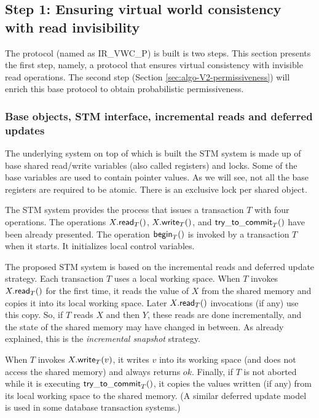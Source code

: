 \subsection{Step 1: Ensuring virtual world consistency with read invisibility}
\label{sec:algorithm-V1}


The protocol (named as IR\_VWC\_P)  is built  is two
steps.  This section  presents  the  first step,  namely,  a protocol  that
ensures  virtual consistency  with  invisible read  operations. The  second
step  (Section  \ref{sec:algo-V2-permissiveness})  will  enrich  this  base
protocol to obtain  probabilistic permissiveness.





\subsubsection{Base objects, STM interface, incremental reads and 
deferred updates}
The underlying system  on top of which  is built the STM system  is made up
of  base shared read/write  variables (also called registers)  and  locks.  
Some of the base variables are used to contain pointer values. 
As we will see, not all the  base registers  are required to be atomic. 
There is an exclusive lock per shared object. 


The STM  system provides  the process that issues a transaction  $T$ with
 four   operations. The operations 
$X.{\sf read}_T()$,   $X.{\sf  write}_T()$,  and ${\sf
try\_to\_commit}_T()$ have been already presented. 
The operation  ${\sf  begin}_T()$  is invoked by a transaction  $T$ when 
it starts.   It initializes local control variables. 


The proposed STM system is based on the incremental reads and deferred 
update strategy. Each transaction $T$ uses a local working space.  
When  $T$ invokes $X.{\sf  read}_T()$  for  the first   time, it  reads the
value of $X$ from  the shared  memory and copies it into its  local working
space. Later  $X.{\sf  read}_T()$ invocations  (if any)  use this copy.
So, if $T$  reads $X$ and then $Y$, these reads  are done incrementally, and
the state of the shared memory may  have changed in between. 
As already explained, this is  the  {\it incremental snapshot} strategy. 


When  $T$ invokes $X.{\sf write}_T(v)$,  it writes  $v$ into  its working
space (and does not access the  shared memory) and always returns $ok$. 
%
Finally, if $T$ is not aborted while it is executing 
${\sf try\_to\_commit}_T()$,  it copies  the values written (if  any) from its
local working  space to  the shared memory.  (A  similar   deferred  update
model  is used  in some  database transaction systems.)  

